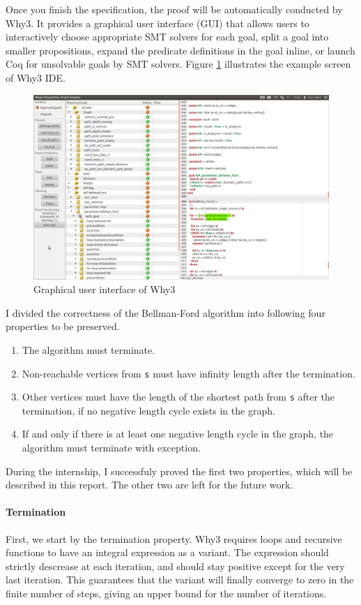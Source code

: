 \documentclass[a4paper,12pt]{article}
\begin{document}
Once you finish the specification, the proof will be automatically
conducted by Why3. It provides a graphical user interface (GUI) that
allows users to interactively choose appropriate SMT solvers for each
goal, split a goal into smaller propositions, expand the predicate
definitions in the goal inline, or launch Coq for unsolvable goals by
SMT solvers. Figure \ref{fig:why3ide} illustrates the example screen
of Why3 IDE.

\begin{figure}[h]\centering
\includegraphics[width=\textwidth]{why3.png}
\caption{Graphical user interface of Why3}\label{fig:why3ide}
\end{figure}

I divided the correctness of the Bellman-Ford algorithm into following
four properties to be preserved.

\begin{enumerate}
\item The algorithm must terminate.
\item Non-reachable vertices from \texttt{s} must have infinity length
  after the termination.
\item Other vertices must have the length of the shortest path from
  \texttt{s} after the termination, if no negative length cycle exists
  in the graph.
\item If and only if there is at least one negative length cycle in
  the graph, the algorithm must terminate with exception.
\end{enumerate}

During the internship, I successfuly proved the first two properties,
which will be described in this report. The other two are left for the
future work.

\paragraph{Termination} First, we start by the termination property. Why3
requires loops and recursive functions to have an integral expression
as a variant. The expression should strictly descrease at each
iteration, and should stay positive except for the very last
iteration. This guarantees that the variant will finally converge to
zero in the finite number of steps, giving an upper bound for the
number of iterations.
 
\end{document}
